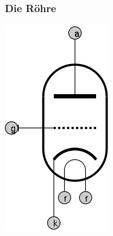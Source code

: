 \begin{frame}
  \frametitle{Die Röhre}
  \begin{minipage}{0.3\textwidth}
    \includegraphics[width=\textwidth,height=.85\textheight,keepaspectratio]{a06/ERohre.png}\\

\end{minipage}
\end{frame}
